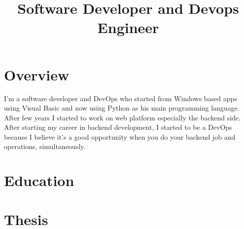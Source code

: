 \documentclass[11pt,a4paper,sans]{moderncv}        %
\title{Software Developer and Devops Engineer}                               %
\begin{document}
\makecvtitle

\section{Overview}
I'm a software developer and DevOps who started from Windows based
apps using Visual Basic and now using Python as his main programming
language. After few years I started to work on web platform especially the
backend side. After starting my career in backend development, I started
to be a DevOps because I believe it’s a good opportunity when you do your backend job and operations, simultaneously.
\section{Education}

\section{Thesis}
\end{document}
